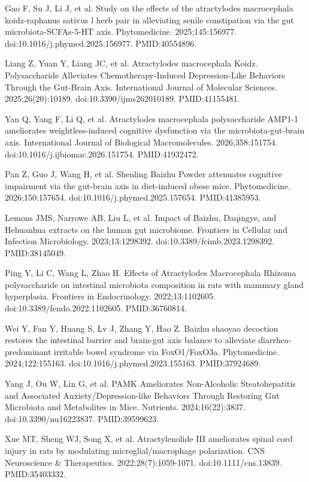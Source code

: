 \documentclass[12pt,oneside]{book}
\newcommand{\reff}[2]{\par\hangindent=7mm\hangafter=1\noindent[#1]\hspace{2mm}#2\par}
\begin{document}
\reff{21}{Gao F, Su J, Li J, et al. Study on the effects of the atractylodes macrocephala koidz-raphanus sativus l herb pair in alleviating senile constipation via the gut microbiota-SCFAs-5-HT axis. Phytomedicine. 2025;145:156977. doi:10.1016/j.phymed.2025.156977. PMID:40554896.}

\reff{22}{Liang Z, Yuan Y, Liang JC, et al. Atractylodes macrocephala Koidz. Polysaccharide Alleviates Chemotherapy-Induced Depression-Like Behaviors Through the Gut-Brain Axis. International Journal of Molecular Sciences. 2025;26(20):10189. doi:10.3390/ijms262010189. PMID:41155481.}

\reff{23}{Yan Q, Yang F, Li Q, et al. Atractylodes macrocephala polysaccharide AMP1-1 ameliorates weightless-induced cognitive dysfunction via the microbiota-gut-brain axis. International Journal of Biological Macromolecules. 2026;358:151754. doi:10.1016/j.ijbiomac.2026.151754. PMID:41932472.}

\reff{24}{Pan Z, Guo J, Wang H, et al. Shenling Baizhu Powder attenuates cognitive impairment via the gut-brain axis in diet-induced obese mice. Phytomedicine. 2026;150:157654. doi:10.1016/j.phymed.2025.157654. PMID:41385953.}

\reff{25}{Lemons JMS, Narrowe AB, Liu L, et al. Impact of Baizhu, Daqingye, and Hehuanhua extracts on the human gut microbiome. Frontiers in Cellular and Infection Microbiology. 2023;13:1298392. doi:10.3389/fcimb.2023.1298392. PMID:38145049.}

\reff{26}{Ping Y, Li C, Wang L, Zhao H. Effects of Atractylodes Macrocephala Rhizoma polysaccharide on intestinal microbiota composition in rats with mammary gland hyperplasia. Frontiers in Endocrinology. 2022;13:1102605. doi:10.3389/fendo.2022.1102605. PMID:36760814.}

\reff{27}{Wei Y, Fan Y, Huang S, Lv J, Zhang Y, Hao Z. Baizhu shaoyao decoction restores the intestinal barrier and brain-gut axis balance to alleviate diarrhea-predominant irritable bowel syndrome via FoxO1/FoxO3a. Phytomedicine. 2024;122:155163. doi:10.1016/j.phymed.2023.155163. PMID:37924689.}

\reff{28}{Yang J, Ou W, Lin G, et al. PAMK Ameliorates Non-Alcoholic Steatohepatitis and Associated Anxiety/Depression-like Behaviors Through Restoring Gut Microbiota and Metabolites in Mice. Nutrients. 2024;16(22):3837. doi:10.3390/nu16223837. PMID:39599623.}

\reff{29}{Xue MT, Sheng WJ, Song X, et al. Atractylenolide III ameliorates spinal cord injury in rats by modulating microglial/macrophage polarization. CNS Neuroscience \& Therapeutics. 2022;28(7):1059-1071. doi:10.1111/cns.13839. PMID:35403332.}
\end{document}
